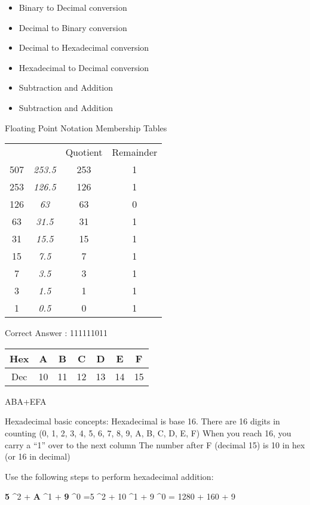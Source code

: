 \begin{itemize}
\item Binary to Decimal conversion
\item Decimal to Binary conversion
\item Decimal to Hexadecimal conversion
\item Hexadecimal to Decimal conversion
\item Subtraction and Addition
\item Subtraction and Addition
\end{itemize}

Floating Point Notation
Membership Tables



\begin{tabular}{|c|c|c|c|}
	&		&	Quotient	&	Remainder	\\
507	&\emph{	253.5	}&	253	&	1	\\
253	&\emph{	126.5	}&	126	&	1	\\
126	&\emph{	63	}&	63	&	0	\\
63	&\emph{	31.5	}&	31	&	1	\\
31	&\emph{	15.5	}&	15	&	1	\\
15	&\emph{	7.5	}&	7	&	1	\\
7	&\emph{	3.5	}&	3	&	1	\\
3	&\emph{	1.5	}&	1	&	1	\\
1	&\emph{	0.5	}&	0	&	1	\\
\end{tabular}

Correct Answer : 111111011


\begin{tabular}{|c||c|c|c|c|c|c|}
\hline Hex & A & B  & C & D & E & F \\  \hline
\hline Dec & 10 & 11 & 12 & 13  &14  &15  \\  \hline
\hline
\end{tabular}

ABA+EFA

Hexadecimal basic concepts:	
Hexadecimal is base 16.
There are 16 digits in counting (0, 1, 2, 3, 4, 5, 6, 7, 8, 9, A, B, C, D, E, F)
When you reach 16, you carry a “1” over to the next column
The number after F (decimal 15) is 10 in hex (or 16 in decimal)

Use the following steps to perform hexadecimal addition:


\textbf{5} ^2 + \textbf{A} ^1  + \textbf{9} ^0
=5 ^2 + 10 ^1  + 9 ^0
= 1280 + 160 + 9

